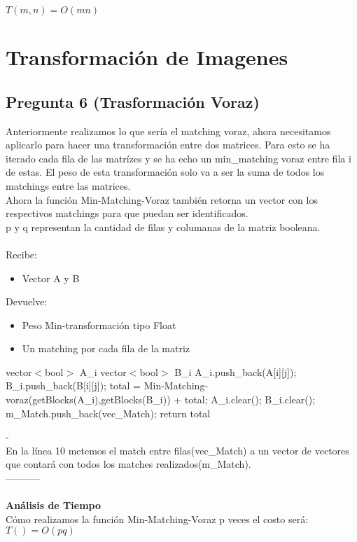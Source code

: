 \documentclass{article}
\newcommand{\TITLE}[1]{\item[#1]}
\begin{document}
$T(m,n) = O(mn)$
		\section{Transformación de Imagenes}
		\subsection*{Pregunta 6 (Trasformación Voraz)}
		Anteriormente realizamos lo que sería el matching voraz, ahora necesitamos aplicarlo para hacer una transformación entre dos matrices. Para esto se ha iterado cada fila de las matrízes y se ha echo un min\_matching voraz entre fila i de  estas. El peso de esta transformación solo va a ser la suma de todos los matchings entre las matrices.\\
		Ahora la función Min-Matching-Voraz también retorna un vector con los respectivos matchings para que puedan ser identificados. \\
		p y q representan la cantidad de filas y columanas de la matriz booleana. 
		\\\\
		Recibe:
		\begin{itemize}
			\item Vector A y B
		\end{itemize}
		Devuelve: 
		\begin{itemize}
			\item Peso Min-transformación tipo Float
			\item Un matching por cada fila de la matriz
		\end{itemize}
		\begin{algorithmic}[1]
			\TITLE{\textsc{Transformacion-Voraz}$(A, B)$}
			\STATE vector$<$bool$>$ A\_i
			\STATE vector$<$bool$>$ B\_i
			\STATE A\_i.push\_back(A[i][j]);
			\STATE B\_i.push\_back(B[i][j]);
			\ENDFOR
			\STATE total = Min-Matching-voraz(getBlocks(A\_i),getBlocks(B\_i)) + total;
			\STATE A\_i.clear();
			\STATE B\_i.clear();
			\STATE m\_Match.push\_back(vec\_Match); 
			\STATE return total
			\ENDFOR
		\end{algorithmic}
		-\\
		En la línea 10 metemos el match entre filas(vec\_Match) a un vector de vectores que contará con todos los matches realizados(m\_Match).\\
		-----------\\\\
		\textbf{Análisis de Tiempo}\\
		Cómo realizamos la función Min-Matching-Voraz p veces el costo será:\\ 
		 $T()= O(pq)$
		
\end{document}
